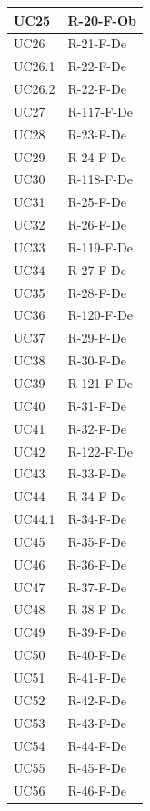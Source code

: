 \documentclass[a4paper, 10pt]{article}
\begin{document}
\begin{longtable}{|p{2.8cm}|p{10cm}|}
        UC25 & R-20-F-Ob \\ \hline
        UC26 & R-21-F-De \\ \hline
        UC26.1 & R-22-F-De \\ \hline
        UC26.2 & R-22-F-De \\ \hline
        UC27 & R-117-F-De \\ \hline
        UC28 & R-23-F-De \\ \hline
        UC29 & R-24-F-De \\ \hline
        UC30 & R-118-F-De \\ \hline
        UC31 & R-25-F-De \\ \hline
        UC32 & R-26-F-De \\ \hline
        UC33 & R-119-F-De \\ \hline
        UC34 & R-27-F-De \\ \hline
        UC35 & R-28-F-De \\ \hline
        UC36 & R-120-F-De \\ \hline
        UC37 & R-29-F-De \\ \hline
        UC38 & R-30-F-De \\ \hline
        UC39 & R-121-F-De \\ \hline
        UC40 & R-31-F-De \\ \hline
        UC41 & R-32-F-De \\ \hline
        UC42 & R-122-F-De \\ \hline
        UC43 & R-33-F-De \\ \hline
        UC44 & R-34-F-De \\ \hline
        UC44.1 & R-34-F-De \\ \hline
        UC45 & R-35-F-De \\ \hline
        UC46 & R-36-F-De \\ \hline
        UC47 & R-37-F-De \\ \hline
        UC48 & R-38-F-De \\ \hline
        UC49 & R-39-F-De \\ \hline
        UC50 & R-40-F-De \\ \hline
        UC51 & R-41-F-De \\ \hline
        UC52 & R-42-F-De \\ \hline
        UC53 & R-43-F-De \\ \hline
        UC54 & R-44-F-De \\ \hline
        UC55 & R-45-F-De \\ \hline
        UC56 & R-46-F-De \\ \hline

\end{longtable}
\end{document}
